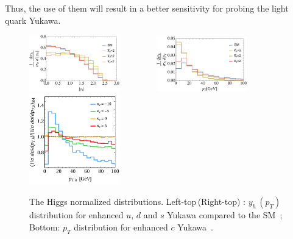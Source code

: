 \documentclass[../report.tex]{subfiles}
\begin{document}
Thus, the use of them will result in a better sensitivity for probing the light quark Yukawa. 
\begin{figure}[t]
\begin{center}
\includegraphics[width=0.35\textwidth]{Disteta.pdf}~~~~~~~~
\includegraphics[width=0.35\textwidth]{DistpT.pdf}\\
\includegraphics[width=0.35\textwidth]{normalizedcharm8TeV.pdf}
\caption{The Higgs normalized distributions. 
Left-top\,(Right-top) : $y_h\,(p_T)$ distribution for enhanced $u$, $d$ and $s$ Yukawa compared to the SM~\cite{Soreq:2016rae};
Bottom: $p_T$ distribution for enhanced $c$ Yukawa~\cite{Bishara:2016jga}. 
}
\label{fig:HiggsDist}
\end{center}
\end{figure}
\end{document}
